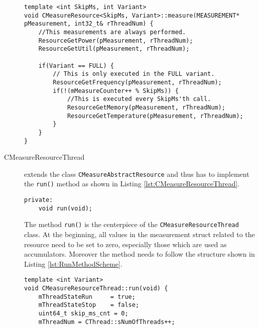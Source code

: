\begin{description}
	\begin{lstlisting}[caption={\added[id=ck]{Abstract minimal example for the \texttt{measure()} method of the \texttt{CMeasureResource} class to clarify the use of the templates.}}, label=lst:CMeasureResourceMeasure]
template <int SkipMs, int Variant>
void CMeasureResource<SkipMs, Variant>::measure(MEASUREMENT* pMeasurement, int32_t& rThreadNum) {
	//This measurements are always performed.
	ResourceGetPower(pMeasurement, rThreadNum);
	ResourceGetUtil(pMeasurement, rThreadNum);

	if(Variant == FULL) {
		// This is only executed in the FULL variant.
		ResourceGetFrequency(pMeasurement, rThreadNum);
		if(!(mMeasureCounter++ % SkipMs)) {
			//This is executed every SkipMs'th call. 
			ResourceGetMemory(pMeasurement, rThreadNum);
			ResourceGetTemperature(pMeasurement, rThreadNum);
		}
	}
}
	\end{lstlisting}
	 
	\item[CMeasureResourceThread] extends the class \texttt{CMeasureAbstractResource} and thus has to implement the \texttt{run()} method as shown in Listing \ref{lst:CMeasureResourceThread}. 
	\begin{lstlisting}[caption={Methods of the \texttt{CMeasureResourceThread} class that programmers have to implement in order to support a new resource.}, label=lst:CMeasureResourceThread]
private:
	void run(void);
	\end{lstlisting}
	The method \texttt{run()} is the centerpiece of the \texttt{CMeasureResourceThread} class. At the beginning, all values in the measurement struct related to the resource need to be set to zero, especially those which are used as accumulators. Moreover the method needs to follow the structure shown in Listing \ref{lst:RunMethodScheme}.
	
\pagebreak
\vspace*{-2.6cm}

\begin{lstlisting}[caption={Scheme of the \texttt{run()} method that each \texttt{CMeasureResourceThread} must have. \added[id=ck]{Listing aktualisiert}}, label=lst:RunMethodScheme]
template <int Variant>
void CMeasureResourceThread::run(void) {
	mThreadStateRun		= true;
	mThreadStateStop	= false;
	uint64_t skip_ms_cnt = 0;
	mThreadNum = CThread::sNumOfThreads++;
	

\end{lstlisting}
\end{description}
